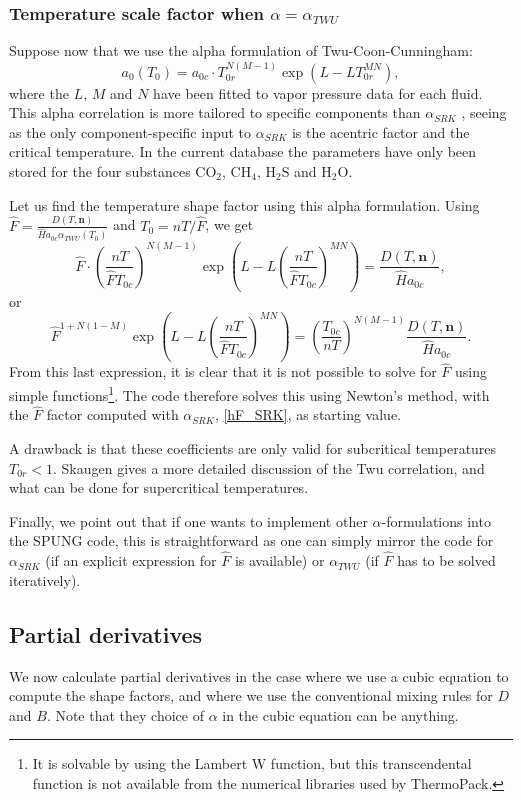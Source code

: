 \documentclass[internal,english]{sintefmemo2012}
\newcommand{\mbn}[0]{\mathbf n}
\newcommand*{\hF}[0]{\hat F}
\newcommand*{\hH}[0]{\hat H}
\newcommand{\lp}{\left(}
\newcommand{\rp}{\right)}
\numberwithin{equation}{section}
\begin{document}
\subsubsection*{Temperature scale factor when $\alpha=\alpha_{TWU}$}
Suppose now that we use the alpha formulation of Twu-Coon-Cunningham:
$$
a_0(T_0) = a_{0c} \cdot T_{0r}^{N(M-1)} \exp \lp L - LT_{0r}^{MN} \rp,
$$
where the $L$, $M$ and $N$ have been fitted to vapor pressure data for
each fluid. This alpha correlation is more tailored to specific
components than $\alpha_{SRK}$ , seeing as the only component-specific
input to $\alpha_{SRK}$ is the acentric factor and the critical
temperature. In the current database the parameters have only been
stored for the four substances $\mathrm{CO}_2$, $\mathrm{CH}_4$,
$\mathrm{H}_2\mathrm{S}$ and $\mathrm{H}_2\mathrm{O}$.

Let us find the temperature shape factor using this alpha
formulation. Using $\hat F = \frac{D(T,\mbn)}{\hH
  a_{0c}\alpha_{TWU}(T_0)}$ and $T_0 = nT/\hF$, we get
$$
\hat F \cdot \lp \frac{nT}{\hF T_{0c}} \rp^{N(M-1)} \exp \lp L - L\lp \frac{nT}{\hF T_{0c}} \rp^{MN} \rp = \frac{D(T,\mbn)}{\hH
  a_{0c}},
$$
or
\begin{equation}
  \label{hF_TWU}
  \hF^{1+N(1-M)} \exp \lp L - L\lp \frac{nT}{\hF T_{0c}} \rp^{MN} \rp =
  \lp \frac{T_{0c}}{nT} \rp^{N(M-1)} \frac{D(T,\mbn)}{\hH a_{0c}}.
\end{equation}
From this last expression, it is clear that it is not possible to
solve for $\hF$ using simple functions\footnote{It is solvable by
  using the Lambert W function, but this transcendental function is
  not available from the numerical libraries used by ThermoPack.}.
The code therefore solves this using Newton's method, with the $\hF$
factor computed with $\alpha_{SRK}$, \eqref{hF_SRK}, as starting value.

A drawback is that these coefficients are only valid for subcritical
temperatures $T_{0r}<1$. Skaugen \cite{Skaugen13} gives a
more detailed discussion of the Twu correlation, and what can be done
for supercritical temperatures.

Finally, we point out that if one wants to implement other
$\alpha$-formulations into the SPUNG code, this is straightforward as
one can simply mirror the code for $\alpha_{SRK}$ (if an explicit
expression for $\hF$ is available) or $\alpha_{TWU}$ (if $\hF$ has to
be solved iteratively). 

\subsection{Partial derivatives} %
We now calculate partial derivatives in the case where we use a cubic
equation to compute the shape factors, and where we use the
conventional mixing rules for $D$ and $B$. Note that they choice of
$\alpha$ in the cubic equation can be anything.
\end{document}

